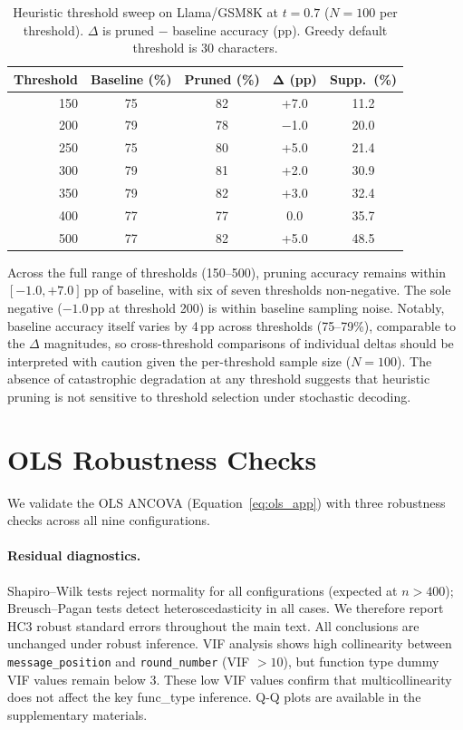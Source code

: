 \begin{table}[htbp]
\centering
\caption{Heuristic threshold sweep on Llama/GSM8K at $t{=}0.7$ ($N{=}100$ per threshold). $\Delta$ is pruned $-$ baseline accuracy (pp). Greedy default threshold is 30 characters.}
\label{tab:threshold_t07}
\small
\begin{tabular}{rcccc}
\toprule
\textbf{Threshold} & \textbf{Baseline (\%)} & \textbf{Pruned (\%)} & $\boldsymbol{\Delta}$ \textbf{(pp)} & \textbf{Supp.\ (\%)} \\
\midrule
150 & 75 & 82 & +7.0 & 11.2 \\
200 & 79 & 78 & $-$1.0 & 20.0 \\
250 & 75 & 80 & +5.0 & 21.4 \\
300 & 79 & 81 & +2.0 & 30.9 \\
350 & 79 & 82 & +3.0 & 32.4 \\
400 & 77 & 77 & 0.0 & 35.7 \\
500 & 77 & 82 & +5.0 & 48.5 \\
\bottomrule
\end{tabular}
\end{table}

Across the full range of thresholds (150--500), pruning accuracy remains within $[-1.0, +7.0]$\,pp of baseline, with six of seven thresholds non-negative. The sole negative ($-1.0$\,pp at threshold 200) is within baseline sampling noise. Notably, baseline accuracy itself varies by 4\,pp across thresholds (75--79\%), comparable to the $\Delta$ magnitudes, so cross-threshold comparisons of individual deltas should be interpreted with caution given the per-threshold sample size ($N{=}100$). The absence of catastrophic degradation at any threshold suggests that heuristic pruning is not sensitive to threshold selection under stochastic decoding.

\section{OLS Robustness Checks}
\label{app:ols-robustness}

We validate the OLS ANCOVA (Equation~\ref{eq:ols_app}) with three robustness checks across all nine configurations.

\paragraph{Residual diagnostics.} Shapiro--Wilk tests reject normality for all configurations (expected at $n > 400$); Breusch--Pagan tests detect heteroscedasticity in all cases. We therefore report HC3 robust standard errors throughout the main text. All conclusions are unchanged under robust inference. VIF analysis shows high collinearity between \texttt{message\_position} and \texttt{round\_number} (VIF $> 10$), but function type dummy VIF values remain below 3. These low VIF values confirm that multicollinearity does not affect the key func\_type inference. Q-Q plots are available in the supplementary materials.

